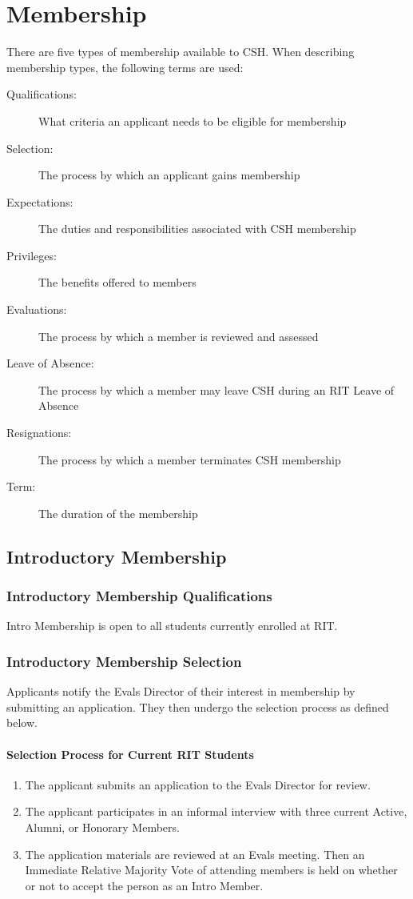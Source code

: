 \documentclass{article}
\newcommand{\article}[1]{\section{#1} \label{#1}}
\newcommand{\asection}[1]{\subsection{#1} \label{#1}}
\newcommand{\asubsection}[1]{\subsubsection{#1} \label{#1}}
\newcommand{\asubsubsection}[1]{\paragraph{#1} \label{#1}}
\begin{document}
\article{Membership}
There are five types of membership available to CSH.
When describing membership types, the following terms are used:
\begin{description}
	\item[Qualifications:] What criteria an applicant needs to be eligible for membership
	\item[Selection:] The process by which an applicant gains membership
	\item[Expectations:] The duties and responsibilities associated with CSH membership
	\item[Privileges:] The benefits offered to members
	\item[Evaluations:] The process by which a member is reviewed and assessed
	\item[Leave of Absence:] The process by which a member may leave CSH during an RIT Leave of Absence
	\item[Resignations:] The process by which a member terminates CSH membership
	\item[Term:] The duration of the membership
\end{description}

\asection{Introductory Membership}

\asubsection{Introductory Membership Qualifications}
Intro Membership is open to all students currently enrolled at RIT.

\asubsection{Introductory Membership Selection}
Applicants notify the Evals Director of their interest in membership by submitting an application.
They then undergo the selection process as defined below.

\asubsubsection{Selection Process for Current RIT Students}
\renewcommand{\theenumi}{\arabic{enumi}} %
\begin{enumerate}
	\item The applicant submits an application to the Evals Director for review.
	\item The applicant participates in an informal interview with three current Active, Alumni, or Honorary Members.
	\item The application materials are reviewed at an Evals meeting.
	      Then an Immediate Relative Majority Vote of attending members is held on whether or not to accept the person as an Intro Member.
\end{enumerate}
\end{document}

